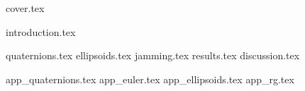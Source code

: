 \documentclass[a4paper]{report}
\begin{document}
{cover.tex}

\tableofcontents
\thispagestyle{empty}
\newpage
\setcounter{page}{1}

{introduction.tex}

{quaternions.tex}
{ellipsoids.tex}
{jamming.tex}
{results.tex}
{discussion.tex}

\newpage
{}

{\renewcommand{\bibname}{References}}

\begin{appendices}

{app_quaternions.tex}
{app_euler.tex}
{app_ellipsoids.tex}
{app_rg.tex}

\end{appendices}
\end{document}
